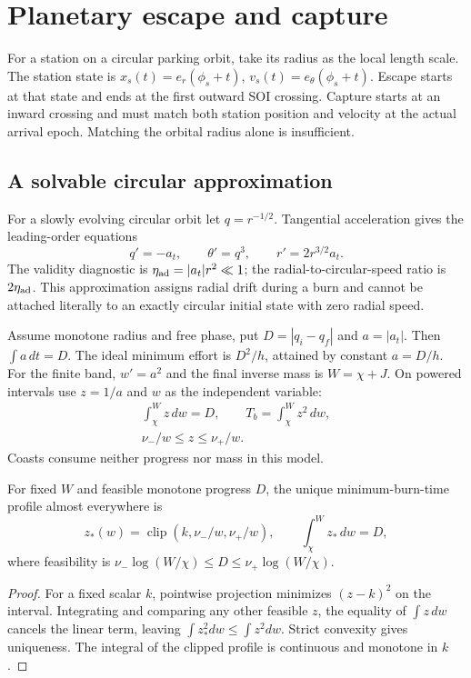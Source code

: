 \section{Planetary escape and capture}
\label{sec:stations}
For a station on a circular parking orbit, take its radius as the local
length scale. The station state is
$x_s(t)=e_r(\phi_s+t)$, $v_s(t)=e_\theta(\phi_s+t)$.
Escape starts at that state and ends at the first outward SOI crossing.
Capture starts at an inward crossing and must match both station
position and velocity at the actual arrival epoch.
Matching the orbital radius alone is insufficient.

\subsection{A solvable circular approximation}
For a slowly evolving circular orbit let $q=r^{-1/2}$.
Tangential acceleration gives the leading-order equations
\begin{equation}
 q'=-a_t,\qquad \theta'=q^3,\qquad r'=2r^{3/2}a_t.
 \label{eq:spiral}
\end{equation}
The validity diagnostic is
$\eta_{\rm ad}=|a_t|r^2\ll1$; the radial-to-circular-speed ratio
is $2\eta_{\rm ad}$. This approximation assigns radial drift during a
burn and cannot be attached literally to an exactly circular initial
state with zero radial speed.

Assume monotone radius and free phase, put $D=|q_i-q_f|$ and
$a=|a_t|$. Then $\int a\,dt=D$. The ideal minimum effort is $D^2/h$,
attained by constant $a=D/h$. For the finite band, $w'=a^2$ and
the final inverse mass is $W=\chi+J$.
On powered intervals use $z=1/a$ and $w$ as the independent variable:
\begin{equation}
 \begin{gathered}
 \int_\chi^W z\,dw=D,\qquad T_b=\int_\chi^W z^2\,dw,\\
 \nu_-/w\le z\le\nu_+/w.
 \end{gathered}
\end{equation}
Coasts consume neither progress nor mass in this model.

\begin{proposition}
For fixed $W$ and feasible monotone progress $D$, the unique
minimum-burn-time profile almost everywhere is
\begin{equation}
 z_*(w)=\operatorname{clip}(k,\nu_-/w,\nu_+/w),\qquad
 \int_\chi^W z_*\,dw=D,
 \label{eq:spiralsolution}
\end{equation}
where feasibility is
$\nu_-\log(W/\chi)\le D\le\nu_+\log(W/\chi)$.
\end{proposition}
\begin{proof}
For a fixed scalar $k$, pointwise projection minimizes $(z-k)^2$
on the interval. Integrating and comparing any other feasible $z$,
the equality of $\int z\,dw$ cancels the linear term, leaving
$\int z_*^2dw\le\int z^2dw$. Strict convexity gives uniqueness.
The integral of the clipped profile is continuous and monotone in $k$.
\end{proof}

